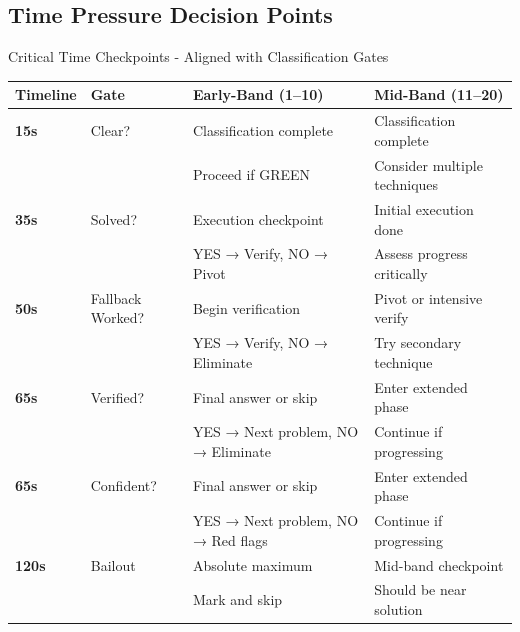 \documentclass{article}
\newcommand{\timer}[1]{\textbf{\textcolor{timegreen}{#1}}}
\begin{document}
\newpage

\subsection{Time Pressure Decision Points}

\begin{timebox}{Critical Time Checkpoints - Aligned with Classification Gates}
\begin{center}
\begin{tabular}{|l|l|l|l|}
\hline
\textbf{Timeline} & \textbf{Gate} & \textbf{Early-Band (1--10)} & \textbf{Mid-Band (11--20)} \\
\hline
\timer{15s} & Clear? & Classification complete & Classification complete \\
 & & Proceed if GREEN & Consider multiple techniques \\
\hline
\timer{35s} & Solved? & Execution checkpoint & Initial execution done \\
 & & YES → Verify, NO → Pivot & Assess progress critically \\
\hline
\timer{50s} & Fallback Worked? & Begin verification & Pivot or intensive verify \\
 & & YES → Verify, NO → Eliminate & Try secondary technique \\
\hline
\timer{65s} & Verified? & Final answer or skip & Enter extended phase \\
 & & YES → Next problem, NO → Eliminate & Continue if progressing \\
\hline
\timer{65s} & Confident? & Final answer or skip & Enter extended phase \\
 & & YES → Next problem, NO → Red flags & Continue if progressing \\
\hline
\timer{120s} & Bailout & Absolute maximum & Mid-band checkpoint \\
 & & Mark and skip & Should be near solution \\
\hline
\end{tabular}
\end{center}


\end{timebox}
\end{document}
